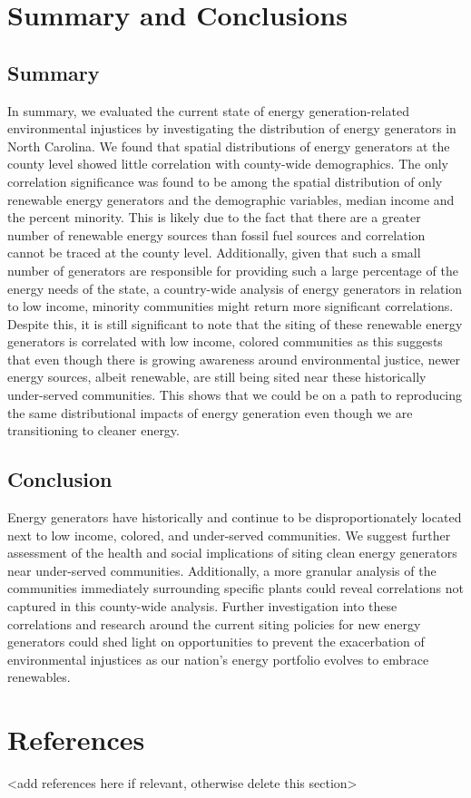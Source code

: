 \documentclass[
  12pt,
]{article}
\begin{document}
\newpage

\hypertarget{summary-and-conclusions}{%
\section{Summary and Conclusions}\label{summary-and-conclusions}}

\hypertarget{summary}{%
\subsection{Summary}\label{summary}}

In summary, we evaluated the current state of energy generation-related
environmental injustices by investigating the distribution of energy
generators in North Carolina. We found that spatial distributions of
energy generators at the county level showed little correlation with
county-wide demographics. The only correlation significance was found to
be among the spatial distribution of only renewable energy generators
and the demographic variables, median income and the percent minority.
This is likely due to the fact that there are a greater number of
renewable energy sources than fossil fuel sources and correlation cannot
be traced at the county level. Additionally, given that such a small
number of generators are responsible for providing such a large
percentage of the energy needs of the state, a country-wide analysis of
energy generators in relation to low income, minority communities might
return more significant correlations. Despite this, it is still
significant to note that the siting of these renewable energy generators
is correlated with low income, colored communities as this suggests that
even though there is growing awareness around environmental justice,
newer energy sources, albeit renewable, are still being sited near these
historically under-served communities. This shows that we could be on a
path to reproducing the same distributional impacts of energy generation
even though we are transitioning to cleaner energy.

\hypertarget{conclusion}{%
\subsection{Conclusion}\label{conclusion}}

Energy generators have historically and continue to be
disproportionately located next to low income, colored, and under-served
communities. We suggest further assessment of the health and social
implications of siting clean energy generators near under-served
communities. Additionally, a more granular analysis of the communities
immediately surrounding specific plants could reveal correlations not
captured in this county-wide analysis. Further investigation into these
correlations and research around the current siting policies for new
energy generators could shed light on opportunities to prevent the
exacerbation of environmental injustices as our nation's energy
portfolio evolves to embrace renewables.

\newpage

\hypertarget{references}{%
\section{References}\label{references}}

\textless add references here if relevant, otherwise delete this
section\textgreater{}
\end{document}

